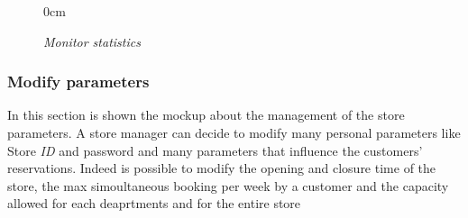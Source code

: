 \documentclass{article}
\begin{document}
\begin{figure}[!h]
\begin{adjustwidth} {0cm}{}
			\end{adjustwidth}
			\caption{\emph{Monitor statistics}}
		\end{figure}
		
		\newpage
		
		\subsubsection{Modify parameters}
		In this section is shown the mockup about the management of the store parameters. A store manager can decide to modify many personal parameters like Store \emph{ID} and password and many parameters that influence the customers' reservations. Indeed is possible to modify the opening and closure time of the store, the max simoultaneous booking per week by a customer and the capacity allowed for each deaprtments and for the entire store
		\bigskip
		\bigskip
\end{document}
